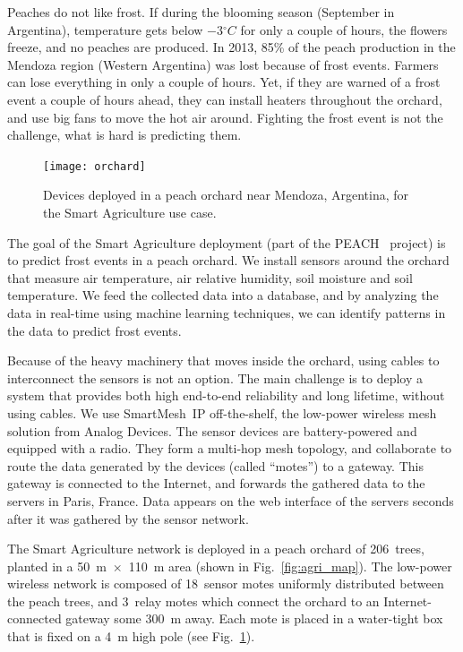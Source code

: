 \documentclass{elsarticle}
\newcommand{\smip}                {SmartMesh~IP\xspace}
\newcommand{\agri}                {Smart Agriculture\xspace}
\begin{document}

Peaches do not like frost.
If during the blooming season (September in Argentina), temperature gets below $-$3$^{\circ}C$ for only a couple of hours, the flowers freeze, and no peaches are produced.
In 2013, 85\% of the peach production in the Mendoza region (Western Argentina) was lost because of frost events.
Farmers can lose everything in only a couple of hours.
Yet, if they are warned of a frost event a couple of hours ahead, they can install heaters throughout the orchard, and use big fans to move the hot air around.
Fighting the frost event is not the challenge, what is hard is predicting them.

\begin{figure}
    \centering
    \texttt{[image: orchard]}
    \caption{Devices deployed in a peach orchard near Mendoza, Argentina, for the \agri use case.}
    \label{fig:agri_pics}
\end{figure}


The goal of the \agri deployment (part of the PEACH~\cite{watteyne16peach} project) is to predict frost events in a peach orchard.
We install sensors around the orchard that measure air temperature, air relative humidity, soil moisture and soil temperature.
We feed the collected data into a database, and by analyzing the data in real-time using machine learning techniques, we can identify patterns in the data to predict frost events.


Because of the heavy machinery that moves inside the orchard, using cables to interconnect the sensors is not an option.
The main challenge is to deploy a system that provides both high end-to-end reliability and long lifetime, without using cables.
We use \smip off-the-shelf, the low-power wireless mesh solution from Analog Devices.
The sensor devices are battery-powered and equipped with a radio.
They form a multi-hop mesh topology, and collaborate to route the data generated by the devices (called ``motes'') to a gateway.
This gateway is connected to the Internet, and forwards the gathered data to the servers in Paris, France.
Data appears on the web interface of the servers seconds after it was gathered by the sensor network.


The \agri network is deployed in a peach orchard of 206~trees, planted in a 50~m~$\times$~110~m area (shown in Fig.~\ref{fig:agri_map}).
The low-power wireless network is composed of 18~sensor motes uniformly distributed between the peach trees, and 3~relay motes which connect the orchard to an Internet-connected gateway some 300~m away.
Each mote is placed in a water-tight box that is fixed on a 4~m high pole (see Fig.~\ref{fig:agri_pics}).
\end{document}
